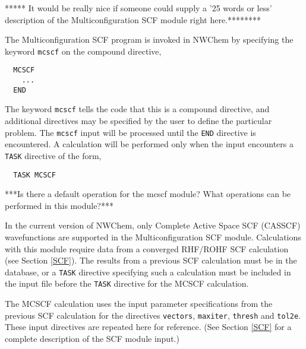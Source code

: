 \label{sec:mcscf}
\Large
*****
It would be really nice if someone could supply a '25 words or less'
description of the Multiconfiguration SCF module right here.********
\normalsize

The Multiconfiguration SCF program is invoked in NWChem 
by specifying the keyword \verb+mcscf+ on the compound directive,

\begin{verbatim}
  MCSCF
    ...
  END
\end{verbatim}

The keyword \verb+mcscf+ tells the code that this is a compound directive,
and additional directives may be specified by the user to define the particular
problem.  The \verb+mcscf+ input will be processed until the
\verb+END+ directive is encountered.  A calculation will be performed 
only when the input encounters a \verb+TASK+ directive of the form,

\begin{verbatim}
  TASK MCSCF
\end{verbatim}

\Large
***Is there a default operation for the mcscf module?  What operations
can be performed in this module?***
\normalsize


In the current version of NWChem, only Complete Active Space SCF (CASSCF) 
wavefunctions are supported in the Multiconfiguration SCF module.  Calculations
with this module require data from a converged  RHF/ROHF SCF calculation
(see Section \ref{SCF}).  The results from a previous SCF calculation must be
in the database, or a \verb+TASK+ directive specifying such a calculation
must be included in the input file before the \verb+TASK+ directive for
the MCSCF calculation.

The MCSCF calculation uses the input parameter specifications from the
previous SCF calculation for the directives \verb+vectors+, \verb+maxiter+,
\verb+thresh+ and \verb+tol2e+.  These  input directives 
are repeated here for reference.  (See Section \ref{SCF} for a complete
description of the SCF module input.)


